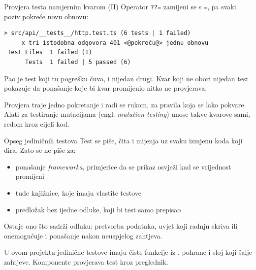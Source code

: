 \begin{frame}[fragile]{Provjera testa namjernim kvarom (II)}
Operator \texttt{??=} zamijeni se s \texttt{=}, pa svaki poziv pokreće novu obnovu:

\begin{lstlisting}[keepspaces=true]
 > src/api/__tests__/http.test.ts (6 tests | 1 failed)
     x tri istodobna odgovora 401 <@pokreću@> jednu obnovu
 Test Files  1 failed (1)
      Tests  1 failed | 5 passed (6)
\end{lstlisting}

\vspace{0.4em}
Pao je test koji tu pogrešku čuva, i nijedan drugi. Kvar koji ne obori nijedan test pokazuje da ponašanje koje bi kvar promijenio nitko ne provjerava.

\vspace{0.4em}
Provjera traje jedno pokretanje i radi se rukom, za pravila koja se lako pokvare. Alati za testiranje mutacijama (engl. \emph{mutation testing}) unose takve kvarove sami, redom kroz cijeli kod.
\end{frame}

\begin{frame}{Opseg jediničnih testova}
Test se piše, čita i mijenja uz svaku izmjenu koda koji dira. Zato se ne piše za:

\vspace{0.6em}
\begin{itemize}
  \itemsep0.45em
  \item ponašanje \emph{frameworka}, primjerice da se prikaz osvježi kad se vrijednost promijeni
  \item tuđe knjižnice, koje imaju vlastite testove
  \item predložak bez ijedne odluke, koji bi test samo prepisao
\end{itemize}

\vspace{0.6em}
Ostaje ono što sadrži odluku: pretvorba podataka, uvjet koji radnju skriva ili onemogućuje i ponašanje nakon neuspjelog zahtjeva.

\vspace{0.6em}
\begin{konvencija}
U ovom projektu jedinične testove imaju čiste funkcije iz , pohrane i sloj koji šalje zahtjeve. Komponente provjerava test kroz preglednik.
\end{konvencija}
\end{frame}

